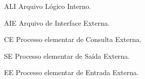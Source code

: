 \begin{siglas}
    \item[ALI] Arquivo Lógico Interno.
    \item[AIE] Arquivo de Interface Externa.
    \item[CE] Processo elementar de Consulta Externa.
    \item[SE] Processo elementar de Saída Externa.
    \item[EE] Processo elementar de Entrada Externa.
\end{siglas}
